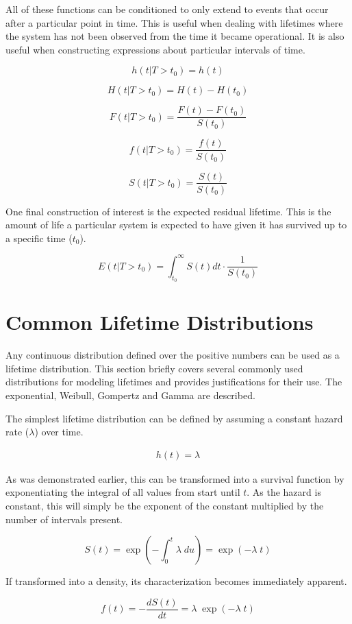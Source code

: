 All of these functions can be conditioned to only extend to events that occur after a particular point in time. This is useful when dealing with lifetimes where the system has not been observed from the time it became operational. It is also useful when constructing expressions about particular intervals of time\cite{Cleves2008}.

$$ h(t|T > t_0) = h(t) $$

$$ H(t|T > t_0) = H(t) - H(t_0) $$

$$ F(t|T > t_0) = \frac{F(t) - F(t_0)}{S(t_0)} $$

$$ f(t|T > t_0) = \frac{f(t)}{S(t_0)} $$

$$ S(t|T > t_0) = \frac{S(t)}{S(t_0)} $$

One final construction of interest is the expected residual lifetime. This is the amount of life a particular system is expected to have given it has survived up to a specific time ($t_0$).

$$ E(t|T > t_0) = \int^\infty_{t_0} S(t) dt \cdot \frac{1}{S(t_0)} $$


\section*{Common Lifetime Distributions}

Any continuous distribution defined over the positive numbers can be used as a lifetime distribution. This section briefly covers several commonly used distributions for modeling lifetimes and provides justifications for their use. The exponential, Weibull, Gompertz and Gamma are described.

The simplest lifetime distribution can be defined by assuming a constant hazard rate ($\lambda$) over time.

\begin{align*}
h(t) = \lambda \tag{ $\lambda > 0$}
\end{align*}

As was demonstrated earlier, this can be transformed into a survival function by exponentiating the integral of all values from start until $t$. As the hazard is constant, this will simply be the exponent of the constant multiplied by the number of intervals present.

$$ S(t) = \exp \left (- \int_0^t \lambda\; du  \right ) = \exp (- \lambda\; t )$$

If transformed into a density, its characterization becomes immediately apparent.

$$ f(t) = - \frac{d S(t)}{dt} = \lambda\; \exp(- \lambda\; t) $$

